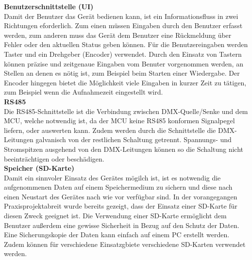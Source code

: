 \textbf{Benutzerschnittstelle (UI)}\\
Damit der Benutzer das Gerät bedienen kann, ist ein Informationsfluss in zwei Richtungen eforderlich. Zum einen müssen Eingaben durch den Benutzer erfasst werden, zum anderen muss das Gerät dem Benutzer eine Rückmeldung über Fehler oder den aktuellen Status geben können. Für die Benutzereingaben werden Taster und ein Drehgeber (Encoder) verwendet. Durch den Einsatz von Tastern können präzise und zeitgenaue Eingaben vom Benuter vorgenommen werden, an Stellen an denen es nötig ist, zum Beispiel beim Starten einer Wiedergabe. Der Encoder hingegen bietet die Möglichkeit viele Eingaben in kurzer Zeit zu tätigen, zum Beispiel wenn die Aufnahmezeit eingestellt wird.\\
\newline
\textbf{RS485}\\
Die RS485-Schnittstelle ist die Verbindung zwischen DMX-Quelle/Senke und dem MCU, welche notwendig ist, da der MCU keine RS485 konformen Signalpegel liefern, oder auswerten kann. Zudem werden durch die Schnittstelle die DMX-Leitungen galvanisch von der restlichen Schaltung getrennt. Spannungs- und Stromspitzen ausgehend von den DMX-Leitungen können so die Schaltung nicht beeinträchtigen oder beschädigen.\\
\newline
\textbf{Speicher (SD-Karte)}\\
Damit ein sinnvoler Einsatz des Gerätes mögilch ist, ist es notwendig die aufgenommenen Daten auf einem Speichermedium zu sichern und diese nach einen Neustart des Gerätes nach wie vor verfügbar sind. In der vorangegangen Praxisprojektabreit wurde bereits gezeigt, dass der Einsatz einer SD-Karte für diesen Zweck geeignet ist. Die Verwendung einer SD-Karte ermöglicht dem Benutzer außerdem eine gewisse Sicherheit in Bezug auf den Schutz der Daten. Eine Sicherungskopie der Daten kann einfach auf einem PC erstellt werden. Zudem können für verschiedene Einsatzgbiete verschiedene SD-Karten verwendet werden.